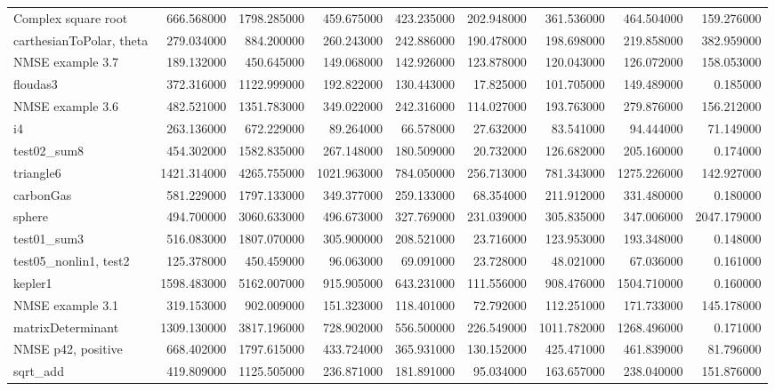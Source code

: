 \begin{longtable}{lrrrrrrrr}
Complex square root & 666.568000 & 1798.285000 & 459.675000 & 423.235000 & 202.948000 & 361.536000 & 464.504000 & 159.276000 \\
carthesianToPolar, theta & 279.034000 & 884.200000 & 260.243000 & 242.886000 & 190.478000 & 198.698000 & 219.858000 & 382.959000 \\
NMSE example 3.7 & 189.132000 & 450.645000 & 149.068000 & 142.926000 & 123.878000 & 120.043000 & 126.072000 & 158.053000 \\
floudas3 & 372.316000 & 1122.999000 & 192.822000 & 130.443000 & 17.825000 & 101.705000 & 149.489000 & 0.185000 \\
NMSE example 3.6 & 482.521000 & 1351.783000 & 349.022000 & 242.316000 & 114.027000 & 193.763000 & 279.876000 & 156.212000 \\
i4 & 263.136000 & 672.229000 & 89.264000 & 66.578000 & 27.632000 & 83.541000 & 94.444000 & 71.149000 \\
test02\_sum8 & 454.302000 & 1582.835000 & 267.148000 & 180.509000 & 20.732000 & 126.682000 & 205.160000 & 0.174000 \\
triangle6 & 1421.314000 & 4265.755000 & 1021.963000 & 784.050000 & 256.713000 & 781.343000 & 1275.226000 & 142.927000 \\
carbonGas & 581.229000 & 1797.133000 & 349.377000 & 259.133000 & 68.354000 & 211.912000 & 331.480000 & 0.180000 \\
sphere & 494.700000 & 3060.633000 & 496.673000 & 327.769000 & 231.039000 & 305.835000 & 347.006000 & 2047.179000 \\
test01\_sum3 & 516.083000 & 1807.070000 & 305.900000 & 208.521000 & 23.716000 & 123.953000 & 193.348000 & 0.148000 \\
test05\_nonlin1, test2 & 125.378000 & 450.459000 & 96.063000 & 69.091000 & 23.728000 & 48.021000 & 67.036000 & 0.161000 \\
kepler1 & 1598.483000 & 5162.007000 & 915.905000 & 643.231000 & 111.556000 & 908.476000 & 1504.710000 & 0.160000 \\
NMSE example 3.1 & 319.153000 & 902.009000 & 151.323000 & 118.401000 & 72.792000 & 112.251000 & 171.733000 & 145.178000 \\
matrixDeterminant & 1309.130000 & 3817.196000 & 728.902000 & 556.500000 & 226.549000 & 1011.782000 & 1268.496000 & 0.171000 \\
NMSE p42, positive & 668.402000 & 1797.615000 & 433.724000 & 365.931000 & 130.152000 & 425.471000 & 461.839000 & 81.796000 \\
sqrt\_add & 419.809000 & 1125.505000 & 236.871000 & 181.891000 & 95.034000 & 163.657000 & 238.040000 & 151.876000 \\

\end{longtable}
